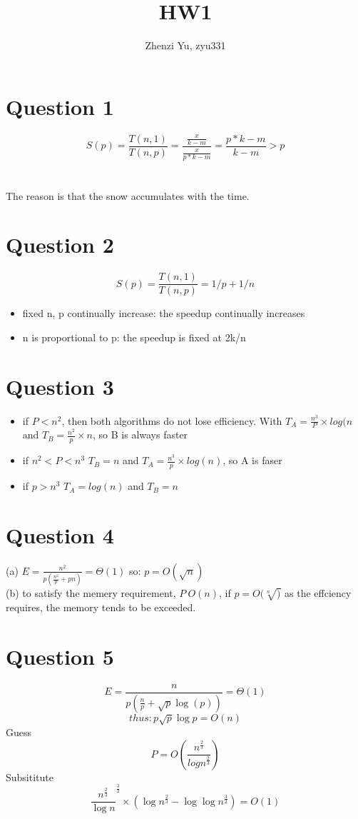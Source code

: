 \documentclass[12pt]{article}
\author{Zhenzi Yu, zyu331}
\title{HW1}
\begin{document}
\maketitle

\section*{Question 1}

$$S(p)=\frac{T(n,1)}{T(n,p)}=\frac{\frac{x}{k-m}}{\frac{x}{p*k-m}}=\frac{p*k-m}{k-m}>p$$
\\
\\The reason is that the snow accumulates with the time.

\section*{Question 2}

$$S(p)=\frac{T(n,1)}{T(n,p)}={1/p+1/n}$$
\begin{itemize}
\item fixed n, p continually increase: the speedup continually increases
\item n is proportional to p: the speedup is fixed at 2k/n
\end{itemize}

\section*{Question 3}

\begin{itemize}
\item if $P<n^2$, then both algorithms do not lose efficiency. With $T_A=\frac{n^3}{P}\times log(n$ and $T_B=\frac{n^2}{p}\times n$, so B is always faster
\item if $n^2<P<n^3$
$T_B=n$ and $T_A=\frac{n^3}{p} \times log(n)$, so A is faser
\item if $p>n^3$ $ T_A=log(n)$ and $T_B=n$

\end{itemize}


\section*{Question 4}
(a) $E=\frac{n^2}{p (\frac{n^2}{p}+pn)}=\Theta(1)$ so: $p=O(\sqrt{n})$
\\
(b) to satisfy the memery requirement, $P~O(n)$, if $p=O(\sqrt[n])$ as the effciency requires, the memory tends to be exceeded.

\section*{Question 5}
$$E=\frac{n}{p (\frac{n}{p}+\sqrt{p} \log(p))}=\Theta(1)$$
$$thus: p \sqrt{p} \log{p} =O(n)$$
Guess $$P=O(\frac{n^\frac{2}{3}}{log n^\frac{2}{3}})$$
Subsititute $$\frac{n^\frac{2}{3}}{\log n}^\frac{3}{2} \times (\log n^\frac{2}{3}- \log \log n^\frac{3}{2})=O(1)$$
\end{document}
